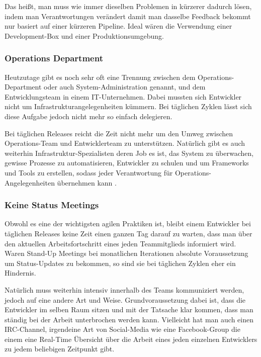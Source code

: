 Das heißt, man muss wie immer dieselben Problemen in kürzerer dadurch lösen, indem man Verantwortungen verändert damit man dasselbe Feedback bekommt nur basiert auf einer kürzeren Pipeline. Ideal wären die Verwendung einer Development-Box und einer Produktionsumgebung.

\subsubsection{Operations Department}
Heutzutage gibt es noch sehr oft eine Trennung zwischen dem Operations-Department oder auch System-Administration genannt, und dem Entwicklungsteam in einem IT-Unternehmen. Dabei mussten sich Entwickler nicht um Infrastrukturangelegenheiten kümmern. Bei täglichen Zyklen lässt sich diese Aufgabe jedoch nicht mehr so einfach delegieren. 

Bei täglichen Releases reicht die Zeit nicht mehr um den Umweg zwischen Operations-Team und Entwicklerteam zu unterstützen. Natürlich gibt es auch weiterhin Infrastruktur-Spezialisten deren Job es ist, das System zu überwachen, gewisse Prozesse zu automatisieren, Entwickler zu schulen und um Frameworks und Tools zu erstellen, sodass jeder Verantwortung für Operations-Angelegenheiten übernehmen kann \cite{weboperations2010}.

\subsubsection{Keine Status Meetings}
Obwohl es eine der wichtigsten agilen Praktiken ist, bleibt einem Entwickler bei täglichen Releases keine Zeit einen ganzen Tag darauf zu warten, dass man über den aktuellen Arbeitsfortschritt eines jeden Teammitglieds informiert wird. Waren Stand-Up Meetings bei monatlichen Iterationen absolute Voraussetzung um Status-Updates zu bekommen, so sind sie bei täglichen Zyklen eher ein Hindernis. 

Natürlich muss weiterhin intensiv innerhalb des Teams kommuniziert werden, jedoch auf eine andere Art und Weise. Grundvoraussetzung dabei ist, dass die Entwickler im selben Raum sitzen und mit der Tatsache klar kommen, dass man ständig bei der Arbeit unterbrochen werden kann. Vielleicht hat man auch einen IRC-Channel, irgendeine Art von Social-Media wie eine Facebook-Group die einem eine Real-Time Übersicht über die Arbeit eines jeden einzelnen Entwicklers zu jedem beliebigen Zeitpunkt gibt. 
